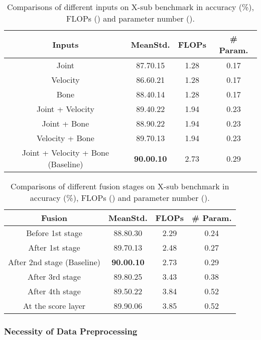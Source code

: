 \documentclass[10pt,journal,compsoc]{IEEEtran}
\begin{document}
\begin{table}[t]
  \caption{Comparisons of different inputs on X-sub benchmark in accuracy (\%), FLOPs () and parameter number ().}
  \label{tab:input}
  \vspace{-0.4cm}
  \centering
  \setlength{\tabcolsep}{4pt}
  \renewcommand{\arraystretch}{1.2}
  \begin{tabular}{c|ccc}
  \toprule
  Inputs & MeanStd. & FLOPs & \# Param. \\
  \midrule
  Joint & 87.70.15 & 1.28 & 0.17 \\
  Velocity & 86.60.21 & 1.28 & 0.17 \\
  Bone & 88.40.14 & 1.28 & 0.17 \\
  \midrule
  Joint + Velocity & 89.40.22 & 1.94 & 0.23 \\
  Joint + Bone & 88.90.22 & 1.94 & 0.23 \\
  Velocity + Bone & 89.70.13 & 1.94 & 0.23 \\
  \midrule
  Joint + Velocity + Bone (Baseline) & {\bf 90.00.10} & 2.73 & 0.29 \\
  \bottomrule
  \end{tabular}
\end{table}

\begin{table}[t]
  \caption{Comparisons of different fusion stages on X-sub benchmark in accuracy (\%), FLOPs () and parameter number ().}
  \label{tab:fusion}
  \vspace{-0.4cm}
  \centering
  \setlength{\tabcolsep}{4pt}
  \renewcommand{\arraystretch}{1.2}
  \begin{tabular}{c|ccc}
  \toprule
  Fusion & MeanStd. & FLOPs & \# Param. \\
  \midrule
  Before 1st stage & 88.80.30 & 2.29 & 0.24 \\
  After 1st stage & 89.70.13 & 2.48 & 0.27 \\
  After 2nd stage (Baseline) & {\bf 90.00.10} & 2.73 & 0.29 \\
  After 3rd stage & 89.80.25 & 3.43 & 0.38 \\
  After 4th stage & 89.50.22 & 3.84 & 0.52 \\
  At the score layer & 89.90.06 & 3.85 & 0.52 \\
  \bottomrule
  \end{tabular}
  \vspace{-0.4cm}
\end{table}

\subsubsection{Necessity of Data Preprocessing}
\label{sssec:compare_input}
\end{document}
